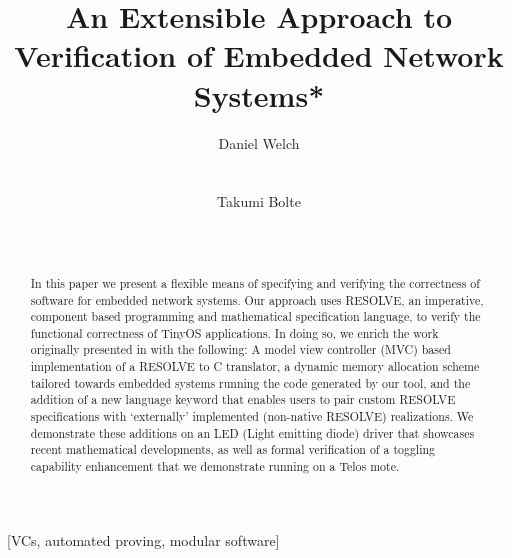 \documentclass{sig-alternate}
\begin{document}
\title{An Extensible Approach to Verification of Embedded Network Systems*}

\author{
\alignauthor
Daniel Welch\\
\\
\\
\alignauthor
Takumi Bolte\\
\\
\\
}

\maketitle
\begin{abstract}

In this paper we present a flexible means of specifying and verifying the correctness of software for embedded network systems. Our approach uses RESOLVE, an imperative, component based programming and mathematical specification language, to verify the functional correctness of TinyOS applications. In doing so, we enrich the work originally presented in \cite{regula:2010} with the following: A model view controller (MVC) based implementation of a RESOLVE to C translator, a dynamic memory allocation scheme tailored towards embedded systems running the code generated by our tool, and the addition of a new language keyword that enables users to pair custom RESOLVE specifications with `externally' implemented (non-native RESOLVE) realizations. We demonstrate these additions on an LED (Light emitting diode) driver that showcases recent mathematical developments, as well as formal verification of a toggling capability enhancement that we demonstrate running on a Telos mote.
\end{abstract}

[VCs, automated proving, modular software]
\end{document}
